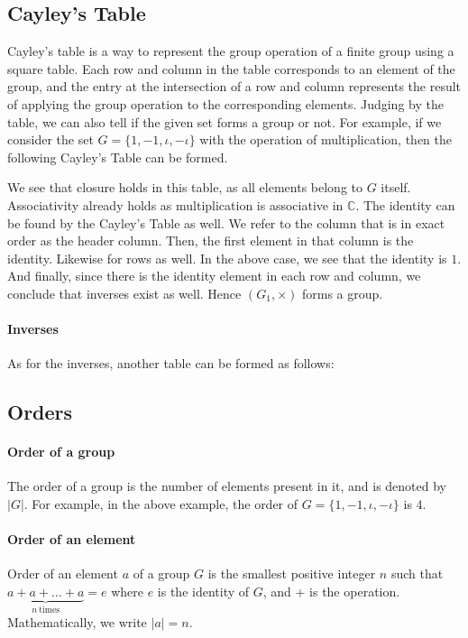 \subsection{Cayley's Table}
Cayley's table is a way to represent the group operation of a finite group using a square table. Each row and column in the table corresponds to an element of the group, and the entry at the intersection of a row and column represents the result of applying the group operation to the corresponding elements. Judging by the table, we can also tell if the given set forms a group or not. For example, if we consider the set $G = \{1, -1, \iota, -\iota\}$ with the operation of multiplication, then the following Cayley's Table can be formed.



We see that closure holds in this table, as all elements belong to $G$ itself. Associativity already holds as multiplication is associative in $\mathbb{C}$. The identity can be found by the Cayley's Table as well. We refer to the column that is in exact order as the header column. Then, the first element in that column is the identity. Likewise for rows as well. In the above case, we see that the identity is $1$. And finally, since there is the identity element in each row and column, we conclude that inverses exist as well. Hence $(G_1, \times)$ forms a group.

\paragraph{Inverses}
As for the inverses, another table can be formed as follows:



\subsection{Orders}
\paragraph{Order of a group}
The order of a group is the number of elements present in it, and is denoted by $|G|$. For example, in the above example, the order of $G = \{1, -1, \iota, -\iota\}$ is $4$.
\paragraph{Order of an element}
Order of an element $a$ of a group $G$ is the smallest positive integer $n$ such that $\underbrace{a + a + \dots + a}_{n\ \text{times}} = e$ where $e$ is the identity of $G$, and $+$ is the operation. Mathematically, we write $|a| = n$.

